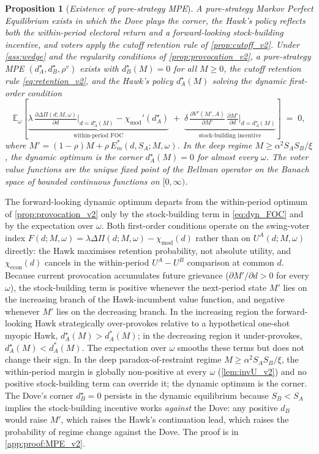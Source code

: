 \documentclass[11pt,twoside]{extarticle}
\newtheorem{proposition}{Proposition}
\begin{document}
\begin{proposition}[\emph{Existence of pure-strategy MPE}]\label{prop:MPE_v2}
\emph{A pure-strategy Markov Perfect Equilibrium exists in which the Dove plays the corner, the Hawk's policy reflects both the within-period electoral return and a forward-looking stock-building incentive, and voters apply the cutoff retention rule of \autoref{prop:cutoff_v2}.}
Under \autoref{ass:wedge} and the regularity conditions of \autoref{prop:provocation_v2}, a pure-strategy MPE $(d_A^\star,d_B^\star,\rho^v)$ exists with $d_B^\star(M)=0$ for all $M\ge 0$, the cutoff retention rule \autoref{eq:retention_v2}, and the Hawk's policy $d_A^\star(M)$ solving the dynamic first-order condition
\begin{equation}\label{eq:dyn_FOC}
    \mathbb{E}_\omega\!\left[\underbrace{\lambda\,\tfrac{\partial\Delta\Pi(d;M,\omega)}{\partial d}\Big|_{d=d_A^\star(M)}-\chi_{\mathrm{mod}}'(d_A^\star)}_{\text{within-period FOC}}\;+\;\underbrace{\delta\,\tfrac{\partial V^v(M',A)}{\partial M'}\,\tfrac{\partial M'}{\partial d}\Big|_{d=d_A^\star(M)}}_{\text{stock-building incentive}}\right]\;=\;0,
\end{equation}
where $M'=(1-\rho)M+\rho\,E_m^*(d,S_A;M,\omega)$. In the deep regime $M\ge\alpha^2 S_A S_B/\xi$, the dynamic optimum is the corner $d_A^\star(M)=0$ for almost every $\omega$. The voter value functions are the unique fixed point of the Bellman operator on the Banach space of bounded continuous functions on $[0,\infty)$.
\end{proposition}

The forward-looking dynamic optimum departs from the within-period optimum of \autoref{prop:provocation_v2} only by the stock-building term in \autoref{eq:dyn_FOC} and by the expectation over $\omega$. Both first-order conditions operate on the swing-voter index $F(d;M,\omega)=\lambda\Delta\Pi(d;M,\omega)-\chi_{\mathrm{mod}}(d)$ rather than on $U^A(d;M,\omega)$ directly: the Hawk maximises retention probability, not absolute utility, and $\chi_{\mathrm{econ}}(d)$ cancels in the within-period $U^A-U^B$ comparison at common $d$. Because current provocation accumulates future grievance ($\partial M'/\partial d>0$ for every $\omega$), the stock-building term is positive whenever the next-period state $M'$ lies on the increasing branch of the Hawk-incumbent value function, and negative whenever $M'$ lies on the decreasing branch. In the increasing region the forward-looking Hawk strategically over-provokes relative to a hypothetical one-shot myopic Hawk, $d_A^\star(M)>d_A^*(M)$; in the decreasing region it under-provokes, $d_A^\star(M)<d_A^*(M)$. The expectation over $\omega$ smooths these terms but does not change their sign. In the deep paradox-of-restraint regime $M\ge\alpha^2 S_A S_B/\xi$, the within-period margin is globally non-positive at every $\omega$ (\autoref{lem:invU_v2}) and no positive stock-building term can override it; the dynamic optimum is the corner. The Dove's corner $d_B^\star=0$ persists in the dynamic equilibrium because $S_B<S_A$ implies the stock-building incentive works \emph{against} the Dove: any positive $d_B$ would raise $M'$, which raises the Hawk's continuation lead, which raises the probability of regime change against the Dove. The proof is in \autoref{app:proof:MPE_v2}.
\end{document}
